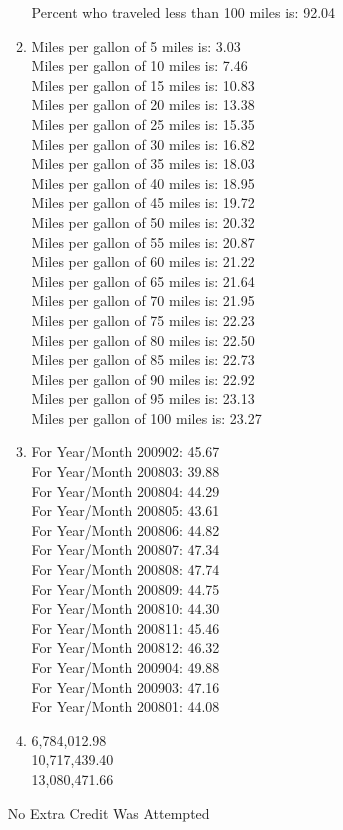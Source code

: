 \documentclass[11pt]{article}  %
\begin{document}
\begin{enumerate}
\begin{enumerate}
Percent who traveled less than 100 miles is: 92.04
\newpage
\item Miles per gallon of 5 miles is: 3.03\\
Miles per gallon of 10 miles is: 7.46\\
Miles per gallon of 15 miles is: 10.83\\
Miles per gallon of 20 miles is: 13.38\\
Miles per gallon of 25 miles is: 15.35\\
Miles per gallon of 30 miles is: 16.82\\
Miles per gallon of 35 miles is: 18.03\\
Miles per gallon of 40 miles is: 18.95\\
Miles per gallon of 45 miles is: 19.72\\
Miles per gallon of 50 miles is: 20.32\\
Miles per gallon of 55 miles is: 20.87\\
Miles per gallon of 60 miles is: 21.22\\
Miles per gallon of 65 miles is: 21.64\\
Miles per gallon of 70 miles is: 21.95\\
Miles per gallon of 75 miles is: 22.23\\
Miles per gallon of 80 miles is: 22.50\\
Miles per gallon of 85 miles is: 22.73\\
Miles per gallon of 90 miles is: 22.92\\
Miles per gallon of 95 miles is: 23.13\\
Miles per gallon of 100 miles is: 23.27\\
\item For Year/Month 200902: 45.67\\
For Year/Month 200803: 39.88\\
For Year/Month 200804: 44.29\\
For Year/Month 200805: 43.61\\
For Year/Month 200806: 44.82\\
For Year/Month 200807: 47.34\\
For Year/Month 200808: 47.74\\
For Year/Month 200809: 44.75\\
For Year/Month 200810: 44.30\\
For Year/Month 200811: 45.46\\
For Year/Month 200812: 46.32\\
For Year/Month 200904: 49.88\\
For Year/Month 200903: 47.16\\
For Year/Month 200801: 44.08\\
\item 6,784,012.98\\
10,717,439.40\\
13,080,471.66
\end{enumerate}

No Extra Credit Was Attempted
\end{enumerate}
\end{document}
